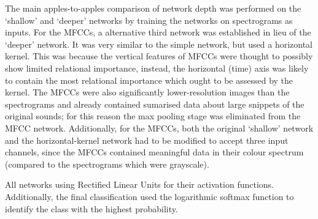 \documentclass[class=report,11pt,crop=false]{standalone}
\begin{document}
The main apples-to-apples comparison of network depth was performed on the `shallow' and `deeper' networks by training the networks on spectrograms as inputs. For the MFCCs, a alternative third network was established in lieu of the `deeper' network. It was very similar to the simple network, but used a horizontal kernel. This was because the vertical features of MFCCs were thought to possibly show limited relational importance, instead, the horizontal (time) axis was likely to contain the most relational importance which ought to be assessed by the kernel. The MFCCs were also significantly lower-resolution images than the spectrograms and already contained sumarised data about large snippets of the original sounds; for this reason the max pooling stage was eliminated from the MFCC network. Additionally, for the MFCCs, both the original `shallow' network and the horizontal-kernel network had to be modified to accept three input channels, since the MFCCs contained meaningful data in their colour spectrum (compared to the spectrograms which were grayscale).

All networks using Rectified Linear Units for their activation functions. Additionally, the final classification used the logarithmic softmax function to identify the class with the highest probability.




\ifstandalone

\printnoidxglossary[type=\acronymtype,nonumberlist]
\fi
\end{document}
